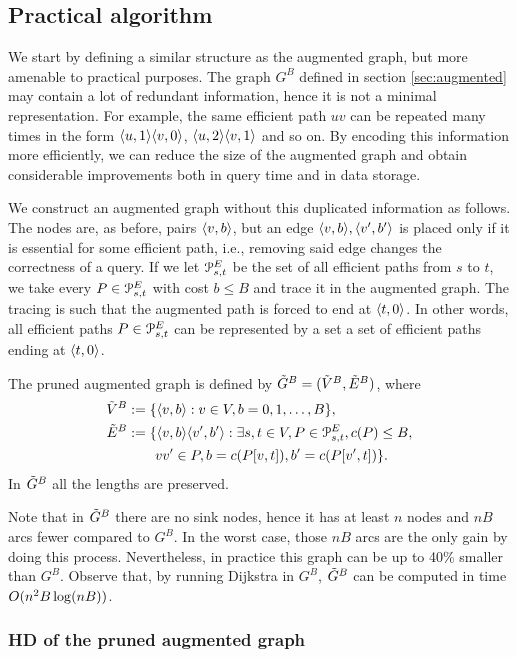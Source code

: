 \subsection{Practical algorithm}
\label{ssec:practical}

We start by defining a similar structure as the augmented graph, but more amenable to practical purposes.
The graph $G^B$ defined in section \ref{sec:augmented} may contain a lot of redundant information, hence it is not a minimal representation.
For example, the same efficient path $uv$ can be repeated many times in the form $\langle u,1\rangle\langle v,0\rangle$, $\langle u,2\rangle\langle v,1\rangle$ and so on.
By encoding this information more efficiently, we can reduce the size of the augmented graph and obtain considerable improvements both in query time and in data storage.

We construct an augmented graph without this duplicated information as follows.
The nodes are, as before, pairs $\langle v,b\rangle$, but an edge $\langle v,b\rangle,\langle v',b'\rangle$ is placed only if it is essential for some efficient path, i.e., removing said edge changes the correctness of a query.
If we let $\mathcal{P}_{s,t}^E$ be the set of all efficient paths from $s$ to $t$, we take every $P\in \mathcal{P}_{s,t}^E$ with cost $b\leq B$ and trace it in the augmented graph.
The tracing is such that the augmented path is forced to end at $\langle t,0\rangle$.
In other words, all efficient paths $P\in \mathcal{P}_{s,t}^E$ can be represented by a set a set of efficient paths ending at $\langle t,0\rangle$. 

\begin{definition}\label{def:pruned_aug_graph}
The pruned augmented graph is defined by $\tilde G^B=(\tilde V^B,\tilde E^B)$, where
\begin{align*}
\tilde V^B &:=\{\langle v,b\rangle: v\in V, b=0,1,\ldots,B\},\\
\tilde E^B &:=\{\langle v,b\rangle\langle v',b'\rangle : \exists s,t\in V, P\in\mathcal{P}^E_{s,t}, c(P)\leq B, \\
&\qquad vv'\in P, b=c(P[v,t]), b'=c(P[v',t])  \}.
\end{align*}
In $\tilde G^B$ all the lengths are preserved.
\end{definition}
Note that in $\tilde G^B$ there are no sink nodes, hence it has at least $n$ nodes and $nB$ arcs fewer compared to $G^B$.
In the worst case, those $nB$ arcs are the only gain by doing this process.
Nevertheless, in practice this graph can be up to 40\% smaller than $G^B$.
Observe that, by running Dijkstra in $G^B$, $\tilde G^B$ can be computed in time $O(n^2B\log(nB))$.

\subsubsection{HD of the pruned augmented graph}

